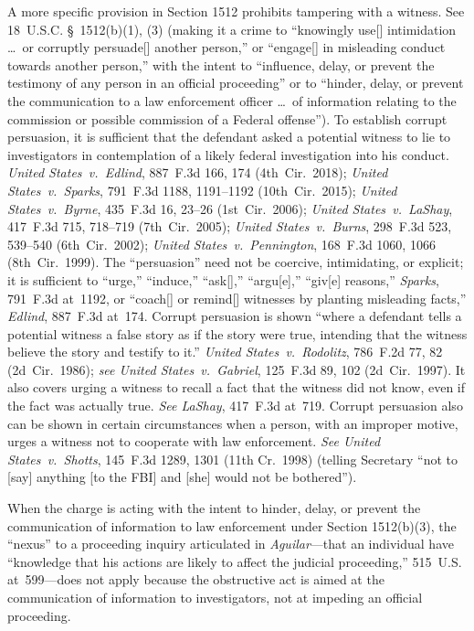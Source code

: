 A more specific provision in Section 1512 prohibits tampering with a witness.
See 18~U.S.C. \S~1512(b)(1), (3) (making it a crime to ``knowingly use[] intimidation \dots\ or corruptly persuade[] another person,'' or ``engage[] in misleading conduct towards another person,'' with the intent to ``influence, delay, or prevent the testimony of any person in an official proceeding'' or to ``hinder, delay, or prevent the communication to a law enforcement officer \dots\ of information relating to the commission or possible commission of a Federal offense'').
To establish corrupt persuasion, it is sufficient that the defendant asked a potential witness to lie to investigators in contemplation of a likely federal investigation into his conduct.
\textit{United States~v.\ Edlind}, 887~F.3d 166, 174 (4th~Cir.~2018);
\textit{United States~v.\ Sparks}, 791~F.3d 1188, 1191--1192 (10th~Cir.~2015);
\textit{United States~v.\ Byrne}, 435~F.3d 16, 23--26 (1st~Cir.~2006);
\textit{United States~v.\ LaShay}, 417~F.3d 715, 718--719 (7th~Cir.~2005);
\textit{United States~v.\ Burns}, 298~F.3d 523, 539--540 (6th~Cir.~2002);
\textit{United States~v.\ Pennington}, 168~F.3d 1060, 1066 (8th~Cir.~1999).
The ``persuasion'' need not be coercive, intimidating, or explicit;
it is sufficient to ``urge,'' ``induce,'' ``ask[],'' ``argu[e],'' ``giv[e] reasons,''
\textit{Sparks}, 791~F.3d at~1192, or ``coach[] or remind[] witnesses by planting misleading facts,''
\textit{Edlind}, 887~F.3d at~174.
Corrupt persuasion is shown ``where a defendant tells a potential witness a false story as if the story were true, intending that the witness believe the story and testify to it.''
\textit{United States~v.\ Rodolitz}, 786~F.2d 77, 82 (2d~Cir.~1986);
\textit{see United States~v.\ Gabriel}, 125~F.3d 89, 102 (2d~Cir.~1997).
It also covers urging a witness to recall a fact that the witness did not know, even if the fact was actually true.
\textit{See LaShay}, 417~F.3d at~719.
Corrupt persuasion also can be shown in certain circumstances when a person, with an improper motive, urges a witness not to cooperate with law enforcement.
\textit{See United States~v.\ Shotts}, 145~F.3d 1289, 1301 (11th Cr.~1998) (telling Secretary ``not to [say] anything [to the FBI] and [she] would not be bothered'').

When the charge is acting with the intent to hinder, delay, or prevent the communication of information to law enforcement under Section 1512(b)(3), the ``nexus'' to a proceeding inquiry articulated in \textit{Aguilar}---that an individual have ``knowledge that his actions are likely to affect the judicial proceeding,'' 515~U.S. at~599---does not apply because the obstructive act is aimed at the communication of information to investigators, not at impeding an official proceeding.

